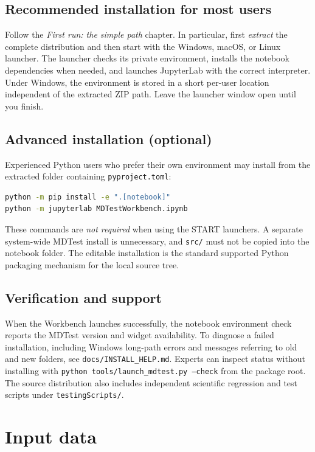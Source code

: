 \documentclass[11pt,oneside]{report}
\begin{document}
\section{Recommended installation for most users}
Follow the \emph{First run: the simple path} chapter. In particular, first \emph{extract} the complete distribution and then start with the Windows, macOS, or Linux launcher. The launcher checks its private environment, installs the notebook dependencies when needed, and launches JupyterLab with the correct interpreter. Under Windows, the environment is stored in a short per-user location independent of the extracted ZIP path. Leave the launcher window open until you finish.

\section{Advanced installation (optional)}
Experienced Python users who prefer their own environment may install from the extracted folder containing \texttt{pyproject.toml}:
\begin{lstlisting}[language=bash]
python -m pip install -e ".[notebook]"
python -m jupyterlab MDTestWorkbench.ipynb
\end{lstlisting}
These commands are \emph{not required} when using the START launchers. A separate system-wide MDTest install is unnecessary, and \texttt{src/} must not be copied into the notebook folder. The editable installation is the standard supported Python packaging mechanism for the local source tree.

\section{Verification and support}
When the Workbench launches successfully, the notebook environment check reports the MDTest version and widget availability. To diagnose a failed installation, including Windows long-path errors and messages referring to old and new folders, see \texttt{docs/INSTALL\_HELP.md}. Experts can inspect status without installing with \texttt{python tools/launch\_mdtest.py --check} from the package root. The source distribution also includes independent scientific regression and test scripts under \texttt{testingScripts/}.

\chapter{Input data}
\end{document}
